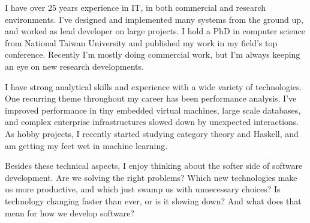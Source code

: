 \documentclass[10pt,a4paper]{../altacv}
\begin{document}

\begin{fullwidth}
\makecvheader

I have over 25 years experience in IT, in both commercial and research environments. I’ve designed and implemented many systems from the ground up, and worked as lead developer on large projects. I hold a PhD in computer science from National Taiwan University and published my work in my field’s top conference. Recently I'm mostly doing commercial work, but I’m always keeping an eye on new research developments.

\medskip

I have strong analytical skills and experience with a wide variety of technologies. One recurring theme throughout my career has been performance analysis. I’ve improved performance in tiny embedded virtual machines, large scale databases, and complex enterprise infrastructures slowed down by unexpected interactions. As hobby projects, I recently started studying category theory and Haskell, and am getting my feet wet in machine learning.

\medskip

Besides these technical aspects, I enjoy thinking about the softer side of software development. Are we solving the right problems? Which new technologies make us more productive, and which just swamp us with unnecessary choices? Is technology changing faster than ever, or is it slowing down? And what does that mean for how we develop software?

\end{fullwidth}

\small


\end{document}
